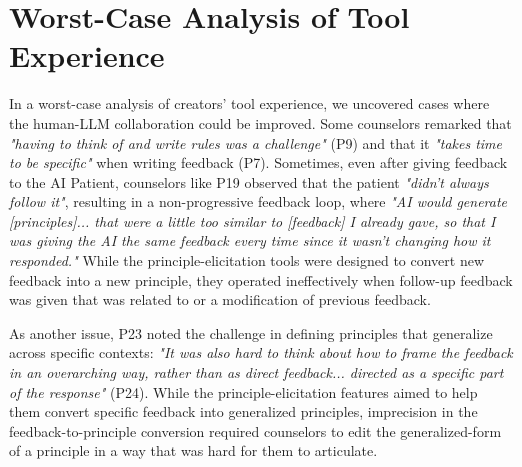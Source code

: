 \documentclass[11pt]{article}
\begin{document}
\begin{table}[t]
    \centering
    \caption{Four measures as part of the tool usage section of the questionnaire taken from ~\cite{petridis2023constitutionmaker}}
    \label{tab:measures-tooluse}
\end{table}
% 
% 
% 

\section{Worst-Case Analysis of Tool Experience} \label{sec:worst-case-tool-experience}
In a worst-case analysis of creators' tool experience, we uncovered cases where the human-LLM collaboration could be improved. Some counselors remarked that \textit{"having to think of and write rules was a challenge"} (P9) and that it \textit{"takes time to be specific"} when writing feedback (P7). Sometimes, even after giving feedback to the AI Patient, counselors like P19 observed that the patient \textit{"didn't always follow it"}, resulting in a non-progressive feedback loop, where \textit{"AI would generate [principles]... that were a little too similar to [feedback] I already gave, so that I was giving the AI the same feedback every time since it wasn't changing how it responded."}  While the principle-elicitation tools were designed to convert new feedback into a new principle, they operated ineffectively when follow-up feedback was given that was related to or a modification of previous feedback.  

As another issue, P23 noted the challenge in defining principles that generalize across specific contexts: \textit{"It was also hard to think about how to frame the feedback in an overarching way, rather than as direct feedback... directed as a specific part of the response"} (P24). While the principle-elicitation features aimed to help them convert specific feedback into generalized principles, imprecision in the feedback-to-principle conversion required counselors to edit the generalized-form of a principle in a way that was hard for them to articulate. 
\end{document}
